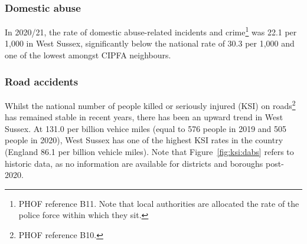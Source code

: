 \subsubsection{Domestic abuse} In 2020/21, the rate of domestic abuse-related incidents and crime\footnote{PHOF reference B11. Note that local authorities are allocated the rate of the police force within which they sit.} was 22.1 per 1,000 in West Sussex, significantly below the national rate of 30.3 per 1,000 and one of the lowest amongst CIPFA neighbours.

\subsubsection{Road accidents} Whilst the national number of people killed or seriously injured (KSI) on roads\footnote{PHOF reference B10.} has remained stable in recent years, there has been an upward trend in West Sussex. At 131.0 per billion vehice miles (equal to 576 people in 2019 and 505 people in 2020), West Sussex has one of the highest KSI rates in the country (England 86.1 per billion vehicle miles). Note that Figure~\ref{fig:ksi:dabs} refers to historic data, as no information are available for districts and boroughs post-2020.



